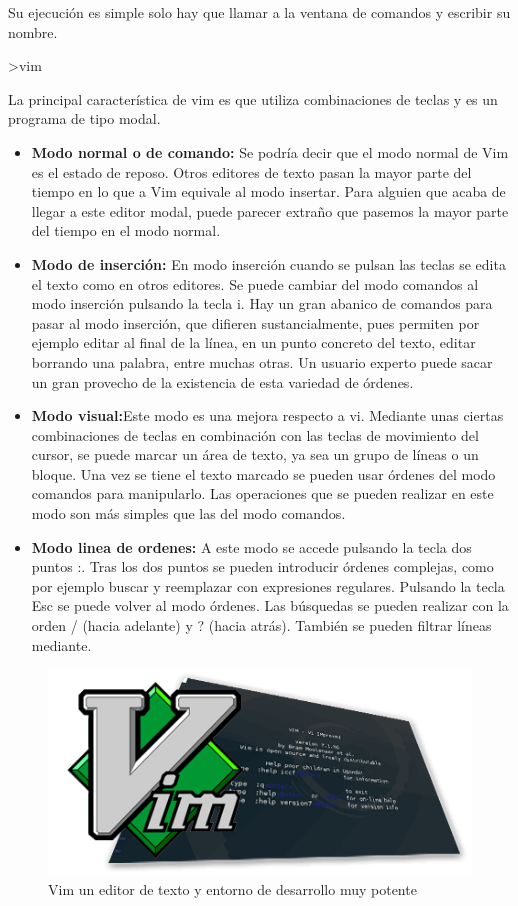 \documentclass[a4paper,12pt,spanish]{article}
\begin{document}
Su ejecución es simple solo hay que llamar a la ventana de comandos y
escribir su nombre.
\begin{tcolorbox}[colback=red!5!white,colframe=red!75!black,fonttitle=\bfseries]
>vim
\end{tcolorbox}

La principal característica de vim es que utiliza combinaciones de
teclas y es un programa de tipo modal.

\begin{itemize}
  \item \textbf{Modo normal o de comando:} Se podría decir que el modo normal de Vim es el estado de reposo. Otros editores de texto pasan la mayor parte del tiempo en lo que a Vim equivale al modo insertar. Para alguien que acaba de llegar a este editor modal, puede parecer extraño que pasemos la mayor parte del tiempo en el modo normal.
  \item \textbf{Modo de inserción:} En modo inserción cuando se pulsan las teclas se edita el texto como en otros editores. Se puede cambiar del modo comandos al modo inserción pulsando la tecla i. Hay un gran abanico de comandos para pasar al modo inserción, que difieren sustancialmente, pues permiten por ejemplo editar al final de la línea, en un punto concreto del texto, editar borrando una palabra, entre muchas otras. Un usuario experto puede sacar un gran provecho de la existencia de esta variedad de órdenes.
  \item \textbf{Modo visual:}Este modo es una mejora respecto a vi. Mediante unas ciertas combinaciones de teclas en combinación con las teclas de movimiento del cursor, se puede marcar un área de texto, ya sea un grupo de líneas o un bloque. Una vez se tiene el texto marcado se pueden usar órdenes del modo comandos para manipularlo. Las operaciones que se pueden realizar en este modo son más simples que las del modo comandos.
  \item \textbf{Modo linea de ordenes:} A este modo se accede pulsando la tecla dos puntos :. Tras los dos puntos se pueden introducir órdenes complejas, como por ejemplo buscar y reemplazar con expresiones regulares. Pulsando la tecla Esc se puede volver al modo órdenes. Las búsquedas se pueden realizar con la orden / (hacia adelante) y ? (hacia atrás). También se pueden filtrar líneas mediante.
\end{itemize}


\begin{figure}[H]
  \centering
  \includegraphics[scale=0.6]{vim}
  \caption{Vim un editor de texto y entorno de desarrollo muy potente }
  \label{fig:vim}
\end{figure}
\end{document}
